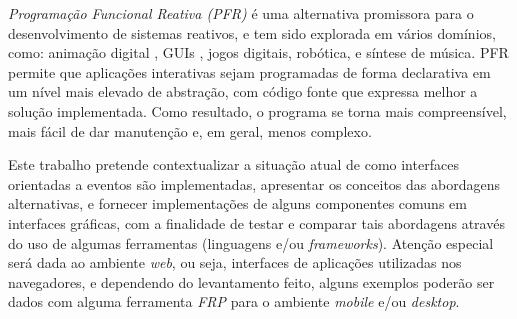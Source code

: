 \emph{Programação Funcional Reativa (PFR)} é uma alternativa promissora para o
desenvolvimento de sistemas reativos, e tem sido explorada em vários domínios,
como: animação digital \cite{Elliott-H:1997:Fran}, GUIs \cite{Czaplicki:2012:Elm},
jogos digitais, robótica, e síntese de música.
PFR permite que aplicações interativas sejam programadas de forma declarativa
em um nível mais elevado de abstração, com código fonte que expressa melhor a
solução implementada.
Como resultado, o programa se torna mais compreensível, mais fácil de dar
manutenção e, em geral, menos complexo.

Este trabalho pretende contextualizar a situação atual
de como interfaces orientadas a eventos são implementadas,
apresentar os conceitos das abordagens alternativas, e
fornecer implementações de alguns componentes comuns em
interfaces gráficas, com a finalidade de testar e comparar
tais abordagens através do uso de algumas ferramentas
(linguagens e/ou \emph{frameworks}). Atenção especial será
dada ao ambiente \emph{web}, ou seja, interfaces de
aplicações utilizadas nos navegadores, e dependendo do
levantamento feito, alguns exemplos poderão ser dados
com alguma ferramenta \emph{FRP} para o ambiente
\emph{mobile} e/ou \emph{desktop}.
